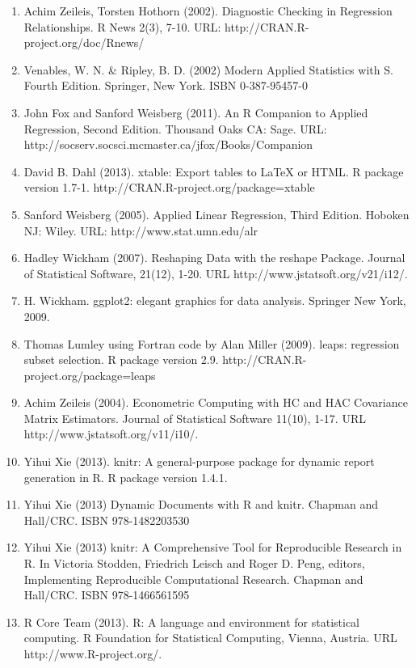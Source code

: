 \documentclass{article}
\begin{document}
\begin{enumerate}[1)]
\item Achim Zeileis, Torsten Hothorn (2002). Diagnostic Checking in Regression Relationships. R News 2(3), 7-10.
\indent URL: http://CRAN.R-project.org/doc/Rnews/
\item Venables, W. N. \& Ripley, B. D. (2002) Modern Applied Statistics with S. Fourth Edition. Springer, New York. ISBN 0-387-95457-0
\item John Fox and Sanford Weisberg (2011). An {R} Companion to Applied Regression, Second Edition. Thousand Oaks CA: Sage. 
\indent URL: http://socserv.socsci.mcmaster.ca/jfox/Books/Companion
\item David B. Dahl (2013). xtable: Export tables to LaTeX or HTML. R package version 1.7-1. 
\indent http://CRAN.R-project.org/package=xtable
\item Sanford Weisberg (2005). Applied Linear Regression, Third Edition. Hoboken NJ: Wiley. 
\indent URL: http://www.stat.umn.edu/alr
\item Hadley Wickham (2007). Reshaping Data with the reshape Package. Journal of Statistical Software, 21(12), 1-20. 
\indent URL http://www.jstatsoft.org/v21/i12/.
\item H. Wickham. ggplot2: elegant graphics for data analysis. Springer New York, 2009.
\item Thomas Lumley using Fortran code by Alan Miller (2009). leaps: regression subset selection. R package version 2.9. 
\indent http://CRAN.R-project.org/package=leaps
\item Achim Zeileis (2004). Econometric Computing with HC and HAC Covariance Matrix Estimators. Journal of Statistical Software 11(10), 1-17. 
\indent URL http://www.jstatsoft.org/v11/i10/.
\item Yihui Xie (2013). knitr: A general-purpose package for dynamic report generation in R. R package version 1.4.1.
\item Yihui Xie (2013) Dynamic Documents with R and knitr. Chapman and Hall/CRC. ISBN 978-1482203530
\item Yihui Xie (2013) knitr: A Comprehensive Tool for Reproducible Research in R. In Victoria Stodden, Friedrich Leisch and Roger D. Peng, editors, Implementing Reproducible Computational Research. Chapman and Hall/CRC. ISBN 978-1466561595
\item R Core Team (2013). R: A language and environment for statistical computing. R Foundation for Statistical Computing, Vienna, Austria. 
\indent URL http://www.R-project.org/.
\end{enumerate}
\end{document}
